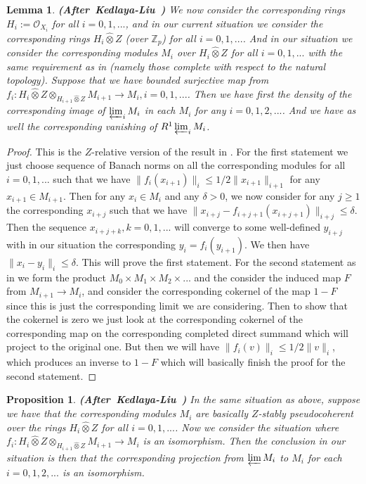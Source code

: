 \documentclass[12pt]{amsart}
\newtheorem{lemma}[theorem]{Lemma}
\newtheorem{proposition}[theorem]{Proposition}
\theoremstyle{definition}
\numberwithin{equation}{section}
\begin{document}
\begin{lemma} \mbox{\bf{(After Kedlaya-Liu \cite[Lemma 2.6.3]{KL2})}} \label{lemma6.24}
We now consider the corresponding rings $H_i:=\mathcal{O}_{X_i}$ for all $i=0,1,...$, and in our current situation we consider the corresponding rings $H_i\widehat{\otimes}Z$ (over $\mathbb{Z}_p$) for all $i=0,1,...$. And in our situation we consider the corresponding modules $M_i$ over $H_i\widehat{\otimes}Z$ for all $i=0,1,...$ with the same requirement as in \cite[Lemma 2.6.3]{KL2} (namely those complete with respect to the natural topology). Suppose that we have bounded surjective map from $f_i:H_{i}\widehat{\otimes}Z\otimes_{H_{i+1}\widehat{\otimes}Z} M_{i+1}\rightarrow M_i,i=0,1,...$. Then we have first the density of the corresponding image of $\varprojlim_i M_i$ in each $M_i$ for any $i=0,1,2,...$. And we have as well the corresponding vanishing of $R^1\varprojlim_i M_i$.
\end{lemma}

\begin{proof}
This is the $Z$-relative version of the result in \cite[Lemma 2.6.3]{KL2}. For the first statement we just choose sequence of Banach norms on all the corresponding modules for all $i=0,1,...$ such that we have $\|f_i(x_{i+1})\|_i\leq 1/2\|x_{i+1}\|_{i+1}$ for any $x_{i+1}\in M_{i+1}$. Then for any $x_i\in M_i$ and any $\delta>0$, we now consider for any $j\geq 1$ the corresponding $x_{i+j}$ such that we have $\|x_{i+j}-f_{i+j+1}(x_{i+j+1})\|_{i+j}\leq \delta$. Then the sequence $x_{i+j+k},k=0,1,...$ will converge to some well-defined $y_{i+j}$ with in our situation the corresponding $y_{i}=f_{i}(y_{i+1})$. We then have $\|x_i-y_i\|_i\leq \delta$. This will prove the first statement. For the second statement as in \cite[Lemma 2.6.3]{KL2} we form the product $M_0\times M_1\times M_2\times...$ and the consider the induced map $F$ from $M_{i+1}\rightarrow M_i$, and consider the corresponding cokernel of the map $1-F$ since this is just the corresponding limit we are considering. Then to show that the cokernel is zero we just look at the corresponding cokernel of the corresponding map on the corresponding completed direct summand which will project to the original one. But then we will have $\|f_i(v)\|_i\leq 1/2 \|v\|_i$, which produces an inverse to $1-F$ which will basically finish the proof for the second statement. 	
\end{proof}


\begin{proposition} \mbox{\bf{(After Kedlaya-Liu \cite[Lemma 2.6.4]{KL2})}} In the same situation as above, suppose we have that the corresponding modules $M_i$ are basically $Z$-stably pseudocoherent over the rings $H_i\widehat{\otimes}Z$ for all $i=0,1,...$. Now we consider the situation where $f_i:H_i\widehat{\otimes}Z\otimes_{H_{i+1}\widehat{\otimes}Z}M_{i+1}\rightarrow M_i$ is an isomorphism. Then the conclusion in our situation is then that the corresponding projection from $\varprojlim M_i$ to $M_i$ for each $i=0,1,2,...$ is an isomorphism. 

	
\end{proposition}
\end{document}
